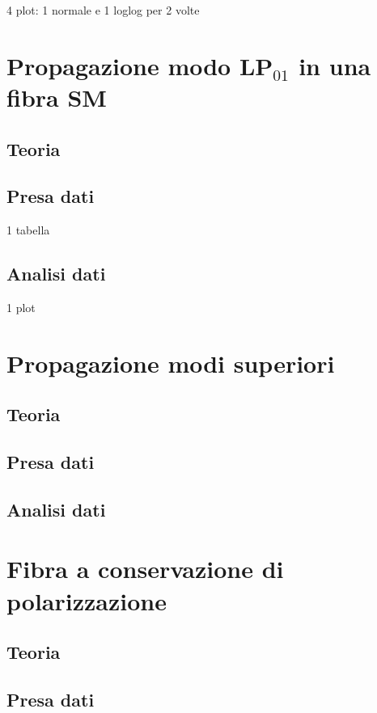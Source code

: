 \documentclass[a4paper]{article}
\begin{document}
4 plot: 1 normale e 1 loglog per 2 volte

\section{Propagazione modo LP$_{01}$ in una fibra SM}

\subsection{Teoria}

\subsection{Presa dati}

1 tabella

\subsection{Analisi dati}

1 plot

\section{Propagazione modi superiori}

\subsection{Teoria}

\subsection{Presa dati}

\subsection{Analisi dati}

\section{Fibra a conservazione di polarizzazione}

\subsection{Teoria}

\subsection{Presa dati}
\end{document}
